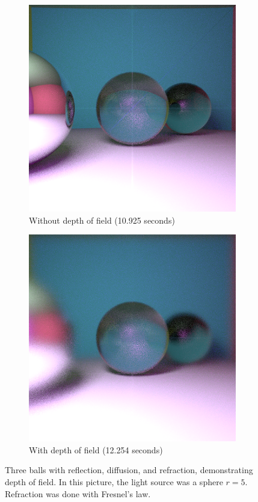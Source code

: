 \documentclass{amsart}
\begin{document}
\begin{figure}
     \centering
     \begin{subfigure}[b]{0.7\textwidth}
         \centering
         \includegraphics[width=\textwidth]{img/fig5_1.png}
         \caption{Without depth of field (10.925 seconds)}
     \end{subfigure}
     \hfill
     \begin{subfigure}[b]{0.7\textwidth}
         \centering
         \includegraphics[width=\textwidth]{img/fig5_2.png}
         \caption{With depth of field (12.254 seconds)}
     \end{subfigure}
     \caption{Three balls with reflection, diffusion, and refraction, demonstrating depth of field. In this picture, the light source was a sphere $r = 5$. Refraction was done with Fresnel's law.}
\end{figure}
\end{document}
